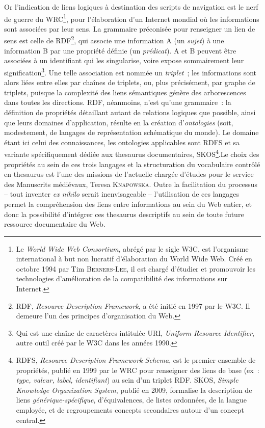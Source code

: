 \documentclass[a4paper,12pt, twoside]{book}
\begin{document}
Or l’indication de liens logiques à destination des scripts de navigation est le nerf de guerre du WRC\footnote{Le \emph{World Wide Web Consortium}, abrégé par le sigle W3C, est l’organisme international à but non lucratif d’élaboration du World Wide Web. Créé en octobre 1994 par Tim \textsc{Berners-Lee}, il est chargé d’étudier et promouvoir les technologies d’amélioration de la compatibilité des informations sur Internet.}, pour l’élaboration d’un Internet mondial où les informations sont associées par leur sens. La grammaire préconisée pour renseigner un lien de sens est celle de RDF\footnote{RDF, \emph{Resource Description Framework}, a été initié en 1997 par le W3C. Il demeure l’un des principes d’organisation du Web.}, qui associe une information A (un \textit{sujet}) à une information B par une propriété définie (un \textit{prédicat}). A et B peuvent être associées à un identifiant qui les singularise, voire expose sommairement leur signification\footnote{Qui est une chaîne de caractères intitulée URI, \emph{Uniform Resource Identifier}, autre outil créé par le W3C dans les années 1990.}. Une telle association est nommée un \textit{triplet}~; les informations sont alors liées entre elles par chaînes de triplets, ou, plus précisément, par graphe de triplets, puisque la complexité des liens sémantiques génère des arborescences dans toutes les directions. RDF, néanmoins, n’est qu’une grammaire~: la définition de propriétés détaillant autant de relations logiques que possible, ainsi que leurs domaines d’application, résulte en la création d’\textit{ontologies} (soit, modestement, de langages de représentation schématique du monde). Le domaine étant ici celui des connaissances, les ontologies applicables sont RDFS et sa variante spécifiquement dédiée aux thesaurus documentaires, SKOS\footnote{RDFS, \emph{Resource Description Framework Schema}, est le premier ensemble de propriétés, publié en 1999 par le WRC pour renseigner des liens de base (ex~: \textit{type, valeur, label, identifiant}) au sein d’un triplet RDF. SKOS, \emph{Simple Knowledge Organization System}, publié en 2009, formalise la description de liens \textit{générique-spécifique}, d’équivalences, de listes ordonnées, de la langue employée, et de regroupements concepts secondaires autour d’un concept central.}.Le choix des propriétés au sein de ces trois langages et la structuration du vocabulaire contrôlé en thesaurus est l’une des missions de l’actuelle chargée d’études pour le service des Manuscrits médiévaux, Teresa \textsc{Knapowska}. Outre la facilitation du processus – tout inventer \textit{ex nihilo} serait inenvisageable – l’utilisation de ces langages permet la compréhension des liens entre informations au sein du Web entier, et donc la possibilité d’intégrer ces thesaurus descriptifs au sein de toute future ressource documentaire du Web.
\end{document}
